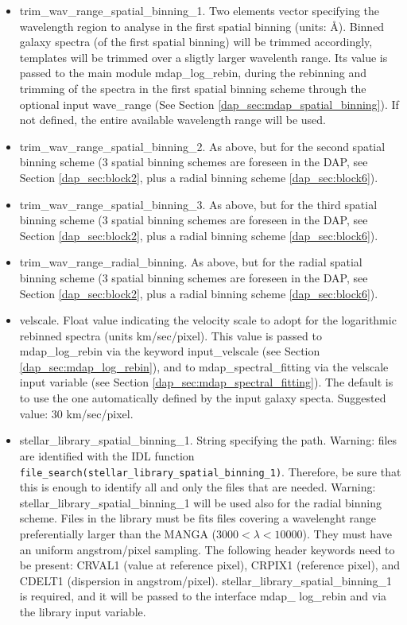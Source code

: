 \begin{itemize}
  \item trim\_wav\_range\_spatial\_binning\_1. Two elements vector
    specifying the wavelength region to analyse in the first spatial
    binning (units: \AA). Binned galaxy spectra (of the first spatial
    binning) will be trimmed accordingly, templates will be trimmed
    over a sligtly larger wavelenth range.  Its value is passed to the
    main module mdap\_log\_rebin, during the rebinning and trimming of
    the spectra in the first spatial binning scheme through the
    optional input wave\_range (See Section
    \ref{dap_sec:mdap_spatial_binning}). If not defined, the entire
    available wavelength range will be used.


  \item trim\_wav\_range\_spatial\_binning\_2. As above, but for the
    second spatial binning scheme (3 spatial binning schemes are
    foreseen in the DAP, see Section \ref{dap_sec:block2}, plus a
    radial binning scheme \ref{dap_sec:block6}).

  \item trim\_wav\_range\_spatial\_binning\_3. As above, but for the
    third spatial binning scheme (3 spatial binning schemes are
    foreseen in the DAP, see Section \ref{dap_sec:block2}, plus a
    radial binning scheme \ref{dap_sec:block6}).

  \item trim\_wav\_range\_radial\_binning. As above, but for the
    radial spatial binning scheme (3 spatial binning schemes are
    foreseen in the DAP, see Section \ref{dap_sec:block2}, plus a
    radial binning scheme \ref{dap_sec:block6}).


  \item velscale. Float value indicating the velocity scale to adopt
    for the logarithmic rebinned spectra (units km/sec/pixel). This
    value is passed to mdap\_log\_rebin via the keyword
    input\_velscale (see Section \ref{dap_sec:mdap_log_rebin}), and to
    mdap\_spectral\_fitting via the velscale input variable (see
    Section \ref{dap_sec:mdap_spectral_fitting}). The default is to
    use the one automatically defined by the input galaxy
    specta. Suggested value: 30 km/sec/pixel.

  \item stellar\_library\_spatial\_binning\_1. String specifying the
    path. Warning: files are identified with the IDL function {\tt
      file\_search(stellar\_library\_spatial\_binning\_1)}. Therefore,
    be sure that this is enough to identify all and only the files
    that are needed. Warning: stellar\_library\_spatial\_binning\_1
    will be used also for the radial binning scheme. Files in the
    library must be fits files covering a wavelenght range
    preferentially larger than the MANGA ($3000< \lambda <
    10000$). They must have an uniform angstrom/pixel sampling. The
    following header keywords need to be present: CRVAL1 (value at
    reference pixel), CRPIX1 (reference pixel), and CDELT1 (dispersion
    in angstrom/pixel). stellar\_library\_spatial\_binning\_1 is
    required, and it will be passed to the interface mdap\_ log\_rebin
    and via the library input variable.


\end{itemize}

